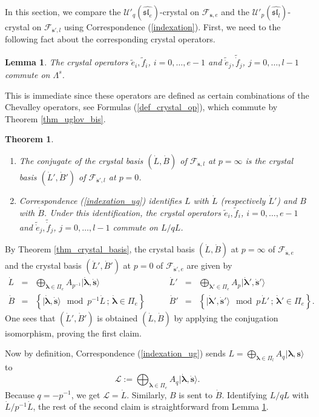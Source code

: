 \documentclass[twoside,12pt]{amsart}
\theoremstyle{plain}
\newcommand{\sL}{\mathscr{L}}
\newcommand{\cF}{\mathcal{F}}
\newcommand{\bs}{\mathbf{s}}
\newcommand{\la}{\lambda}
\newcommand{\La}{\Lambda}
\newcommand{\bla}{\boldsymbol{\la}}
\newcommand{\te}{\tilde{e}}
\newcommand{\tf}{\tilde{f}}
\newcommand{\dB}{\dot{B}}
\newcommand{\dL}{\dot{L}}
\newcommand{\dbs}{\dot{\bs}}
\newcommand{\dbla}{\dot{\bla}}
\newcommand{\tde}{\tilde{\dot{e}}}
\newcommand{\tdf}{\tilde{\dot{f}}}
\newcommand{\Ue}{\mathcal{U}'_q (\widehat{\mathfrak{sl}_e})}
\newcommand{\Ul}{\mathcal{U}'_p (\widehat{\mathfrak{sl}_l})}
\newcommand{\dispst}{\displaystyle}
\newtheorem{thm}[num]{Theorem}
\newtheorem{lem}[num]{Lemma}
\theoremstyle{remark}
\begin{document}
In this section, we compare the $\Ue$-crystal on $\cF_{\bs,e}$ and the $\Ul$-crystal on $\cF_{\dbs',l}$
using Correspondence (\ref{indexation}).
First, we need to the following fact about the corresponding crystal operators.

\begin{lem}\label{lem_comm_crystals}
The crystal operators $\te_i, \tf_i$, $i=0,\dots,e-1$ and $\tde_j,\tdf_j$, $j=0,\dots,l-1$ commute on $\La^s$.
\end{lem}

\proof
This is immediate since these operators are defined as certain combinations of the Chevalley operators, see Formulas (\ref{def_crystal_op}),
which commute by Theorem \ref{thm_uglov_bis}.
\endproof


\begin{thm}\label{thm_comm_crystal}\
\begin{enumerate}
\item  The conjugate of the crystal basis $(\dL,\dB)$ of $\cF_{\dbs,l}$ at $p=\infty$
is the crystal basis $(\dL',\dB')$ of $\cF_{\dbs',l}$ at $p=0$.
\item Correspondence (\ref{indexation_ug}) identifies $L$ with $\dL$ (respectively $\dL'$) and $B$ with $\dB$.
Under this identification, the crystal operators $\te_i, \tf_i$, $i=0,\dots,e-1$ and $\tde_j,\tdf_j$, $j=0,\dots,l-1$ commute on $L/qL$.
\end{enumerate}
\end{thm}

\proof 
By Theorem \ref{thm_crystal_basis},
the crystal basis $(\dL,\dB)$ at $p=\infty$ of $\cF_{\dbs,e}$ and
the crystal basis $(\dL',\dB')$ at $p=0$ of $\cF_{\dbs',e}$ are given by 
$$\begin{array}{cclccl}
\dL
&=& \dispst
\bigoplus_{\dbla\in\Pi_e} A_{p^{-1}} |\dbla,\dbs\rangle 
&
\dL'
&=& \dispst
\bigoplus_{\dbla'\in\Pi_e} A_{p^{}} |\dbla',\dbs'\rangle 
\\
\dB
&=&
\left\{ |\dbla,\dbs\rangle \mod p^{-1}\dL \, ; \, \dbla\in\Pi_e \right\} \quad\quad
&
\dB'
&=&
\left\{ |\dbla',\dbs'\rangle \mod p^{}\dL' \, ; \, \dbla'\in\Pi_e \right\}.
\end{array}
$$
One sees that $(\dL',\dB')$ is obtained $(\dL,\dB)$ by applying the conjugation isomorphism, proving the first claim.

Now by definition, Correspondence (\ref{indexation_ug}) sends $L=\bigoplus_{\bla\in\Pi_l} A_{q^{}} |\bla,\bs\rangle$ 
to $$\sL:=\bigoplus_{\dbla\in\Pi_e} A_{q^{}} |\dbla,\dbs\rangle.$$
Because $q=-p^{-1}$, we get $\sL=\dL$.
Similarly, $B$ is sent to $\dB$. 
Identifying $L/qL$ with $\dL/p^{-1}\dL$, the rest of the second claim is straightforward from Lemma \ref{lem_comm_crystals}.
\endproof
\end{document}
